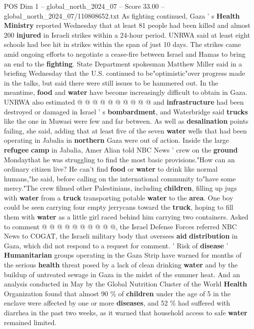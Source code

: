 \begin{textsample}{POS Dim 1 – global\_north\_2024\_07 – Score 33.00 – global\_north\_2024\_07/110808652.txt}
As fighting continued, Gaza ' s \textbf{Health} \textbf{Ministry} reported Wednesday that at least 81 people had been killed and almost 200 \textbf{injured} in Israeli strikes within a 24-hour period.
UNRWA said at least eight schools had bee hit in strikes within the span of just 10 days.
The strikes came amid ongoing efforts to negotiate a cease-fire between Israel and Hamas to bring an end to the \textbf{fighting}.
State Department spokesman Matthew Miller said in a briefing Wednesday that the U.S. continued to be"optimistic"over progress made in the talks, but said there were still issues to be hammered out.
In the meantime, \textbf{food} and \textbf{water} have become increasingly difficult to obtain in Gaza.
UNRWA also estimated @ @ @ @ @ @ @ @ @ @ and \textbf{infrastructure} had been destroyed or damaged in Israel ' s \textbf{bombardment}, and Waterbridge said \textbf{trucks} like the one in Muwasi were few and far between.
As well as \textbf{desalination} points failing, she said, adding that at least five of the seven \textbf{water} wells that had been operating in Jabalia in \textbf{northern} Gaza were out of action.
Inside the large \textbf{refugee} \textbf{camp} in Jabalia, Amer Alian told NBC News ' crew on the \textbf{ground} Mondaythat he was struggling to find the most basic provisions."How can an ordinary citizen live?
He can't find \textbf{food} or \textbf{water} to drink like normal humans,"he said, before calling on the international community to"have some mercy."The crew filmed other Palestinians, including \textbf{children}, filling up jugs with \textbf{water} from a \textbf{truck} transporting potable \textbf{water} to the \textbf{area}.
One boy could be seen carrying four empty jerrycans toward the \textbf{truck}, hoping to fill them with \textbf{water} as a little girl raced behind him carrying two containers.
Asked to comment @ @ @ @ @ @ @ @ @ @, the Israel Defense Forces referred NBC News to COGAT, the Israeli military body that oversees \textbf{aid} \textbf{distribution} in Gaza, which did not respond to a request for comment. ' Risk of \textbf{disease} ' \textbf{Humanitarian} groups operating in the Gaza Strip have warned for months of the serious \textbf{health} threat posed by a lack of clean drinking \textbf{water} and by the buildup of untreated sewage in Gaza in the midst of the summer heat.
And an analysis conducted in May by the Global Nutrition Cluster of the World \textbf{Health} Organization found that almost 90 \% of \textbf{children} under the age of 5 in the enclave were affected by one or more \textbf{diseases}, and 52 \% had suffered with diarrhea in the past two weeks, as it warned that household access to safe \textbf{water} remained limited.

\end{textsample}
